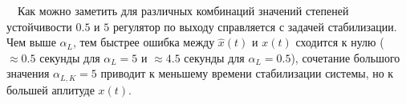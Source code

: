 \newpage
\,
\newpage
\,
\newpage
Как можно заметить для различных комбинаций значений степеней устойчивости $0.5$ и $5$ регулятор по выходу справляется с задачей стабилизации. Чем выше $\alpha_L$, тем быстрее ошибка между $\hat{x}(t)$ и $x(t)$ сходится к нулю ($\approx 0.5$ секунды для $\alpha_L= 5$ и $\approx 4.5$ секунды для $\alpha_L= 0.5$), сочетание большого значения $\alpha_{L,K}=5$ приводит к меньшему времени стабилизации системы, но к большей аплитуде $x(t)$.


\endinput